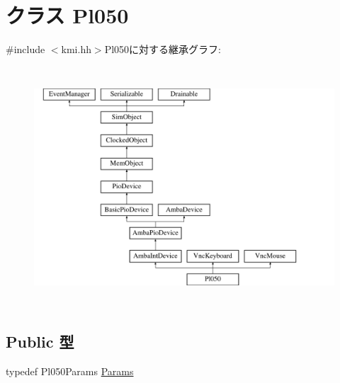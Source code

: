 \hypertarget{classPl050}{
\section{クラス Pl050}
\label{classPl050}
}


{\ttfamily \#include $<$kmi.hh$>$}Pl050に対する継承グラフ:\begin{figure}[H]
\begin{center}
\leavevmode
\includegraphics[height=9cm]{classPl050}
\end{center}
\end{figure}
\subsection*{Public 型}
\begin{DoxyCompactItemize}
\item 
typedef Pl050Params \hyperlink{classPl050_a12cd0d18c639c998ce04efabfca4d619}{Params}
\end{DoxyCompactItemize}
